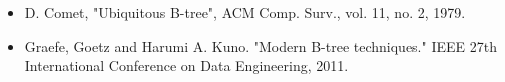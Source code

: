\documentclass[usenames,dvipsnames, 18pt, compress, aspectratio=169]{beamer}
\begin{document}
\begin{frame}
    \frametitle{}
    \begin{center}
    \end{center}
\end{frame}

\begin{frame}[fragile]{}
    \frametitle{}

    \begin{itemize}[label={\MVRightarrow}]
        \item <+-> D. Comet, "Ubiquitous B-tree", ACM Comp. Surv., vol. 11, no.
            2, 1979.
        \item <+-> Graefe, Goetz and Harumi A. Kuno. "Modern B-tree
            techniques." IEEE 27th International Conference on Data
            Engineering, 2011.
    \end{itemize}
\end{frame}
\end{document}
